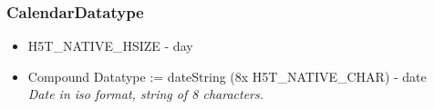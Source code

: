 \documentclass{article}
\begin{document}
			\subsubsection{CalendarDatatype}
				\begin{itemize}
					\item H5T\_NATIVE\_HSIZE - day
					\item Compound Datatype := dateString (8x H5T\_NATIVE\_CHAR) - date
							\\ \textit{Date in iso format, string of 8 characters.}

				\end{itemize}
\end{document}
